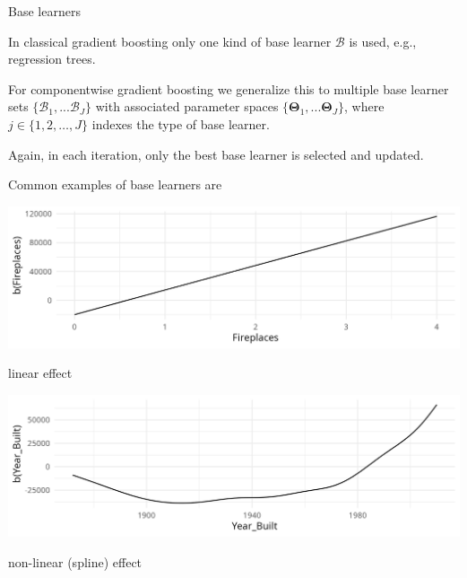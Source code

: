 \documentclass[11pt,compress,t,notes=noshow, xcolor=table]{beamer}
\begin{document}
\begin{vbframe}{Base learners}

In classical gradient boosting only one kind of base learner $\mathcal{B}$ is used, e.g.,
regression trees.

\lz

For componentwise gradient boosting we generalize this to multiple base learner sets $\{ \mathcal{B}_1, ... \mathcal{B}_J \}$ with associated parameter spaces
$\{ \bm{\Theta}_1, ... \bm{\Theta}_J \}$,
%
 where $j \in \{ 1, 2, \dots, J \}$ indexes the type of base learner.
%
\lz

Again, in each iteration, only the best base learner
is selected and updated.

\framebreak

Common examples of base learners are

\begin{minipage}{0.4\textwidth}
    \includegraphics[width=\linewidth]{figure/compboost-base-learner-linear.png}
\end{minipage}\hfill
\begin{minipage}{0.5\textwidth}
  linear effect
\end{minipage}

\begin{minipage}{0.4\textwidth}
    \includegraphics[width=\linewidth]{figure/compboost-base-learner-spline.png}
\end{minipage}\hfill
\begin{minipage}{0.5\textwidth}
  non-linear (spline) effect
\end{minipage}


\end{vbframe}
\end{document}
